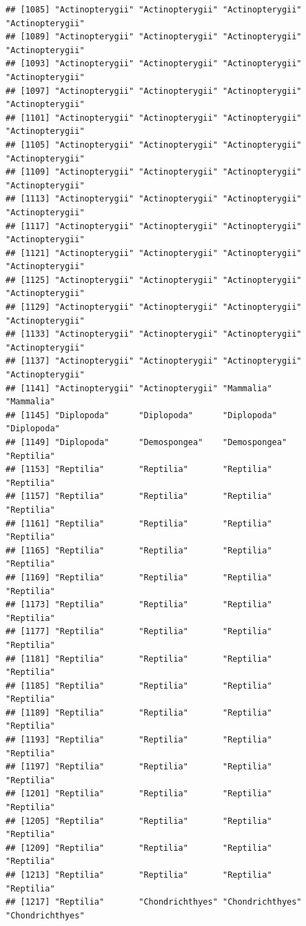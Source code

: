 \documentclass[
]{article}
\begin{document}
\begin{verbatim}
## [1085] "Actinopterygii" "Actinopterygii" "Actinopterygii" "Actinopterygii"
## [1089] "Actinopterygii" "Actinopterygii" "Actinopterygii" "Actinopterygii"
## [1093] "Actinopterygii" "Actinopterygii" "Actinopterygii" "Actinopterygii"
## [1097] "Actinopterygii" "Actinopterygii" "Actinopterygii" "Actinopterygii"
## [1101] "Actinopterygii" "Actinopterygii" "Actinopterygii" "Actinopterygii"
## [1105] "Actinopterygii" "Actinopterygii" "Actinopterygii" "Actinopterygii"
## [1109] "Actinopterygii" "Actinopterygii" "Actinopterygii" "Actinopterygii"
## [1113] "Actinopterygii" "Actinopterygii" "Actinopterygii" "Actinopterygii"
## [1117] "Actinopterygii" "Actinopterygii" "Actinopterygii" "Actinopterygii"
## [1121] "Actinopterygii" "Actinopterygii" "Actinopterygii" "Actinopterygii"
## [1125] "Actinopterygii" "Actinopterygii" "Actinopterygii" "Actinopterygii"
## [1129] "Actinopterygii" "Actinopterygii" "Actinopterygii" "Actinopterygii"
## [1133] "Actinopterygii" "Actinopterygii" "Actinopterygii" "Actinopterygii"
## [1137] "Actinopterygii" "Actinopterygii" "Actinopterygii" "Actinopterygii"
## [1141] "Actinopterygii" "Actinopterygii" "Mammalia"       "Mammalia"      
## [1145] "Diplopoda"      "Diplopoda"      "Diplopoda"      "Diplopoda"     
## [1149] "Diplopoda"      "Demospongea"    "Demospongea"    "Reptilia"      
## [1153] "Reptilia"       "Reptilia"       "Reptilia"       "Reptilia"      
## [1157] "Reptilia"       "Reptilia"       "Reptilia"       "Reptilia"      
## [1161] "Reptilia"       "Reptilia"       "Reptilia"       "Reptilia"      
## [1165] "Reptilia"       "Reptilia"       "Reptilia"       "Reptilia"      
## [1169] "Reptilia"       "Reptilia"       "Reptilia"       "Reptilia"      
## [1173] "Reptilia"       "Reptilia"       "Reptilia"       "Reptilia"      
## [1177] "Reptilia"       "Reptilia"       "Reptilia"       "Reptilia"      
## [1181] "Reptilia"       "Reptilia"       "Reptilia"       "Reptilia"      
## [1185] "Reptilia"       "Reptilia"       "Reptilia"       "Reptilia"      
## [1189] "Reptilia"       "Reptilia"       "Reptilia"       "Reptilia"      
## [1193] "Reptilia"       "Reptilia"       "Reptilia"       "Reptilia"      
## [1197] "Reptilia"       "Reptilia"       "Reptilia"       "Reptilia"      
## [1201] "Reptilia"       "Reptilia"       "Reptilia"       "Reptilia"      
## [1205] "Reptilia"       "Reptilia"       "Reptilia"       "Reptilia"      
## [1209] "Reptilia"       "Reptilia"       "Reptilia"       "Reptilia"      
## [1213] "Reptilia"       "Reptilia"       "Reptilia"       "Reptilia"      
## [1217] "Reptilia"       "Chondrichthyes" "Chondrichthyes" "Chondrichthyes"

\end{verbatim}
\end{document}
